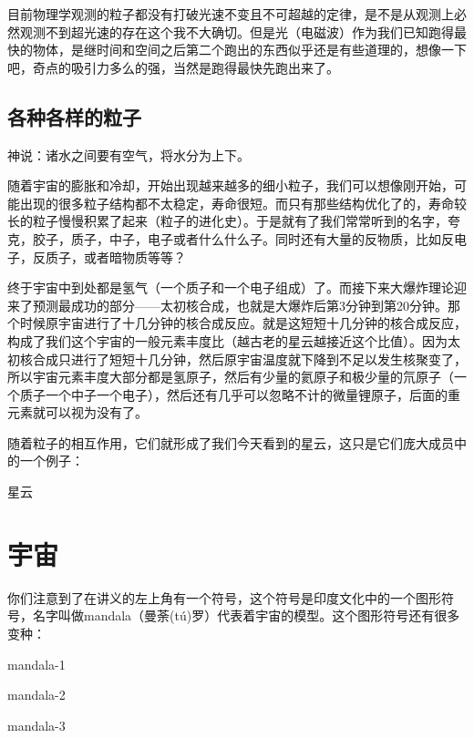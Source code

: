 \documentclass[12pt]{exam}%
\begin{document}
目前物理学观测的粒子都没有打破光速不变且不可超越的定律，是不是从观测上必然观测不到超光速的存在这个我不大确切。但是光（电磁波）作为我们已知跑得最快的物体，是继时间和空间之后第二个跑出的东西似乎还是有些道理的，想像一下吧，奇点的吸引力多么的强，当然是跑得最快先跑出来了。


\subsection{各种各样的粒子}
\begin{flushright}
\begin{notecard}[ce7f4fe]{12em}
神说：诸水之间要有空气，将水分为上下。 
\end{notecard}
\end{flushright}

随着宇宙的膨胀和冷却，开始出现越来越多的细小粒子，我们可以想像刚开始，可能出现的很多粒子结构都不太稳定，寿命很短。而只有那些结构优化了的，寿命较长的粒子慢慢积累了起来（粒子的进化史）。于是就有了我们常常听到的名字，夸克，胶子，质子，中子，电子或者什么什么子。同时还有大量的反物质，比如反电子，反质子，或者暗物质等等？

终于宇宙中到处都是氢气（一个质子和一个电子组成）了。而接下来大爆炸理论迎来了预测最成功的部分——太初核合成，也就是大爆炸后第3分钟到第20分钟。那个时候原宇宙进行了十几分钟的核合成反应。就是这短短十几分钟的核合成反应，构成了我们这个宇宙的一般元素丰度比（越古老的星云越接近这个比值）。因为太初核合成只进行了短短十几分钟，然后原宇宙温度就下降到不足以发生核聚变了，所以宇宙元素丰度大部分都是氢原子，然后有少量的氦原子和极少量的氘原子（一个质子一个中子一个电子），然后还有几乎可以忽略不计的微量锂原子，后面的重元素就可以视为没有了。

随着粒子的相互作用，它们就形成了我们今天看到的星云，这只是它们庞大成员中的一个例子：
\begin{linefig}[0.8]{星云}
\end{linefig}



\section{宇宙}
你们注意到了在讲义的左上角有一个符号，这个符号是印度文化中的一个图形符号，名字叫做mandala（曼荼(tú)罗）代表着宇宙的模型。这个图形符号还有很多变种：
\begin{multicols}{3}
\begin{linefig}{mandala-1}
\end{linefig}
\columnbreak
\begin{linefig}{mandala-2}
\end{linefig}
\columnbreak
\begin{linefig}{mandala-3}
\end{linefig}
\end{multicols}
\end{document}
